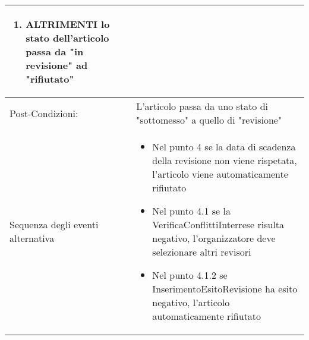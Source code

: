 \begin{tabular}{|p{3cm}|p{7cm}|}
\begin{enumerate}
                   \item ALTRIMENTI lo stato dell'articolo passa da "in revisione" ad "rifiutato"
                   \end{enumerate}\\
\hline
Post-Condizioni: &L'articolo passa da uno stato di "sottomesso" a quello di "revisione" \\
\hline
Sequenza degli eventi alternativa & \begin{itemize}
\item Nel punto 4 se la data di scadenza della revisione non viene rispetata, l'articolo viene automaticamente rifiutato
\item Nel punto 4.1 se la VerificaConflittiInterrese risulta negativo, l'organizzatore deve selezionare altri revisori
\item Nel punto 4.1.2 se InserimentoEsitoRevisione ha esito negativo, l'articolo automaticamente rifiutato
\end{itemize}\\
\hline
\end{tabular}

